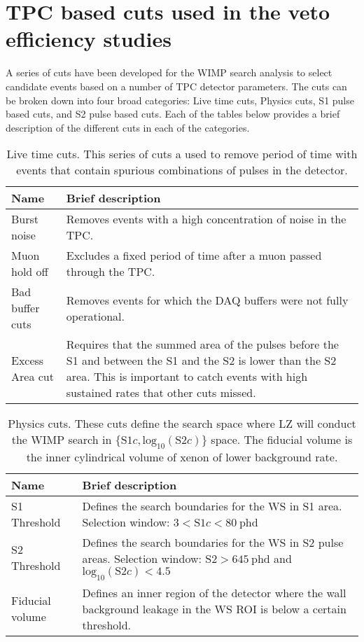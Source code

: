 \section{TPC based cuts used in the veto efficiency studies}\label{sec:app/WSCoreCuts}
A series of cuts have been developed for the WIMP search analysis to select candidate events based on a number of TPC detector parameters. The cuts can be broken down into four broad categories: Live time cuts, Physics cuts, S1 pulse based cuts, and S2 pulse based cuts. Each of the tables below provides a brief description of the different cuts in each of the categories.
\begin{table}[h!]
    \centering
    \caption{Live time cuts. This series of cuts a used to remove period of time with events that contain spurious combinations of pulses in the detector.}
    \begin{tabular}{|m{10em}m{22em}|}
    \hline
    \textbf{Name} & \textbf{Brief description} \\
    \hline\hline
    Burst noise & Removes events with a high concentration of noise in the TPC.\\
    \hline
    Muon hold off & Excludes a fixed period of time after a muon passed through the TPC.\\
    \hline
    Bad buffer cuts & Removes events for which the DAQ buffers were not fully operational.\\
    \hline
    Excess Area cut & Requires that the summed area of the pulses before the S1 and between the S1 and the S2 is lower than the S2 area. This is important to catch events with high sustained rates that other cuts missed.\\
    \hline
    \end{tabular}
\end{table}
\begin{table}[h!]
    \centering
    \caption{Physics cuts. These cuts define the search space where LZ will conduct the WIMP search in $\{\text{S1}c,\text{log}_{10}(\text{S2}c)\}$ space. The fiducial volume is the inner cylindrical volume of xenon of lower background rate.}
    \begin{tabular}{|m{10em}m{22em}|}
    \hline
    \textbf{Name}&\textbf{Brief description}\\
    \hline\hline
    S1 Threshold & Defines the search boundaries for the WS in S1 area. Selection window: $3<\text{S1}c<80~\text{phd}$ \\
    \hline
    S2 Threshold & Defines the search boundaries for the WS in S2 pulse areas. Selection window: $\text{S2}>645~\text{phd}$ and $\text{log}_{10}(\text{S2}c)<4.5$ \\
    \hline
    Fiducial volume & Defines an inner region of the detector where the wall background leakage in the WS ROI is below a certain threshold.\\
    \hline
    \end{tabular}
\end{table}
